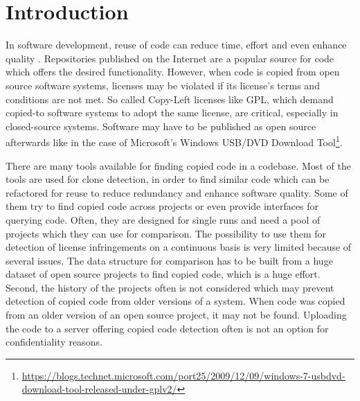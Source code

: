 
\chapter{Introduction}\label{chapter:introduction}
In software development, reuse of code can reduce time, effort and even enhance quality \cite{krueger1992software}.
Repositories published on the Internet are a popular source for code which offers the desired functionality.
However, when code is copied from open source software systems, licenses may be violated if its license's terms and conditions are not met.
So called Copy-Left licenses like GPL, which demand copied-to software systems to adopt the same license, are critical, especially in closed-source systems.
Software may have to be published as open source afterwards like in the case of Microsoft's \glqq Windows USB/DVD Download Tool\grqq\footnote{\href{https://blogs.technet.microsoft.com/port25/2009/12/09/windows-7-usbdvd-download-tool-released-under-gplv2/}{https://blogs.technet.microsoft.com/port25/2009/12/09/windows-7-usbdvd-download-tool-released-under-gplv2/}}.

There are many tools available for finding copied code in a codebase.
Most of the tools are used for clone detection, in order to find similar code which can be refactored for reuse to reduce redundancy and enhance software quality.
Some of them try to find copied code across projects or even provide interfaces for querying code.
Often, they are designed for single runs and need a pool of projects which they can use for comparison.
The possibility to use them for detection of license infringements on a continuous basis is very limited because of several issues.
The data structure for comparison has to be built from a huge dataset of open source projects to find copied code, which is a huge effort.
Second, the history of the projects often is not considered which may prevent detection of copied code from older versions of a system.
When code was copied from an older version of an open source project, it may not be found.
Uploading the code to a server offering copied code detection often is not an option for confidentiality reasons.

